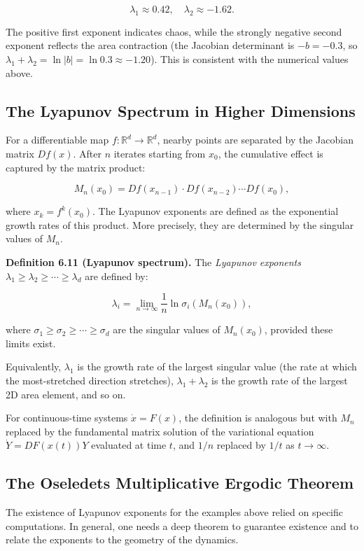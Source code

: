 \[
\lambda_1 \approx 0.42, \quad \lambda_2 \approx -1.62.
\]

The positive first exponent indicates chaos, while the strongly negative second exponent reflects the area contraction (the Jacobian determinant is $-b = -0.3$, so $\lambda_1 + \lambda_2 = \ln|b| = \ln 0.3 \approx -1.20$). This is consistent with the numerical values above.

\subsection{The Lyapunov Spectrum in Higher Dimensions}\label{sec:6.3.3}

For a differentiable map $f: \mathbb{R}^d \to \mathbb{R}^d$, nearby points are separated by the Jacobian matrix $Df(x)$. After $n$ iterates starting from $x_0$, the cumulative effect is captured by the matrix product:

\[
M_n(x_0) = Df(x_{n-1}) \cdot Df(x_{n-2}) \cdots Df(x_0),
\]

where $x_k = f^k(x_0)$. The Lyapunov exponents are defined as the exponential growth rates of this product. More precisely, they are determined by the singular values of $M_n$.

\textbf{Definition 6.11 (Lyapunov spectrum).} The \textit{Lyapunov exponents} $\lambda_1 \geq \lambda_2 \geq \cdots \geq \lambda_d$ are defined by:

\[
\lambda_i = \lim_{n \to \infty} \frac{1}{n} \ln \sigma_i(M_n(x_0)),
\]

where $\sigma_1 \geq \sigma_2 \geq \cdots \geq \sigma_d$ are the singular values of $M_n(x_0)$, provided these limits exist.

Equivalently, $\lambda_1$ is the growth rate of the largest singular value (the rate at which the most-stretched direction stretches), $\lambda_1 + \lambda_2$ is the growth rate of the largest 2D area element, and so on.

For continuous-time systems $\dot{x} = F(x)$, the definition is analogous but with $M_n$ replaced by the fundamental matrix solution of the variational equation $\dot{Y} = DF(x(t)) Y$ evaluated at time $t$, and $1/n$ replaced by $1/t$ as $t \to \infty$.

\subsection{The Oseledets Multiplicative Ergodic Theorem}\label{sec:6.3.4}

The existence of Lyapunov exponents for the examples above relied on specific computations. In general, one needs a deep theorem to guarantee existence and to relate the exponents to the geometry of the dynamics.

